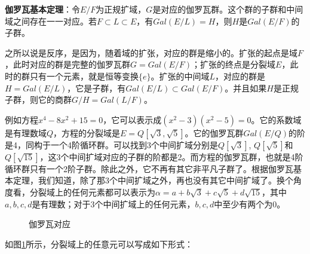 \documentclass[b5paper]{ctexart}
\begin{document}
\begin{theorem}
\textbf{伽罗瓦基本定理}：令$E/F$为正规扩域，$G$是对应的伽罗瓦群。这个群的子群和中间域之间存在一一对应。若$F \subset L \subset E$，有$Gal(E/L) = H$，则$H$是$Gal(E/F)$的子群。
\end{theorem}

之所以说是反序，是因为，随着域的扩张，对应的群是缩小的。扩张的起点是域$F$，此时对应的群是完整的伽罗瓦群$G = Gal(E/F)$；扩张的终点是分裂域$E$，此时的群只有一个元素，就是恒等变换$\{e\}$。扩张的中间域$L$，对应的群是$H = Gal(E/L)$，它是子群，有$Gal(E/L) \subset Gal(E/F)$。并且如果$H$是正规子群，则它的商群$G/H = Gal(L/F)$。

例如方程$x^4 - 8x^2 + 15 = 0$，它可以表示成$(x^2 - 3)(x^2 - 5) = 0$。它的系数域是有理数域$Q$，方程的分裂域是$E = Q[\sqrt{3}, \sqrt{5}]$。它的伽罗瓦群$Gal(E/Q)$的阶是4，同构于一个4阶循环群。可以找到3个中间扩域分别是$Q[\sqrt{3}]$, $Q[\sqrt{5}]$和$Q[\sqrt{15}]$，这3个中间扩域对应的子群的阶都是2。而方程的伽罗瓦群，也就是4阶循环群只有一个2阶子群。除此之外，它不再有其它非平凡子群了。根据伽罗瓦基本定理，我们知道，除了那3个中间扩域之外，再也没有其它中间扩域了。换个角度看，分裂域上的任何元素都可以表示为$\alpha = a + b\sqrt{3} + c\sqrt{5} + d\sqrt{15}$，其中$a, b, c, d$是有理数；对于3个中间扩域上的任何元素，$b, c, d$中至少有两个为0。

\begin{figure}[htbp]
\centering
{}
\caption{伽罗瓦对应}
\label{fig:Galois-Correspondence}
\end{figure}

如图\ref{fig:Galois-Correspondence}所示，分裂域上的任意元可以写成如下形式：
\end{document}
